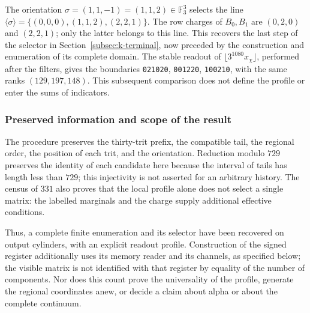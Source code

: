 The orientation \(\sigma=(1,1,-1)=(1,1,2)\in\mathbb F_3^3\)
selects the line
\(\langle\sigma\rangle=\{(0,0,0),(1,1,2),(2,2,1)\}\).
The row charges of \(B_0,B_1\) are \((0,2,0)\) and \((2,2,1)\);
only the latter belongs to this line. This recovers the last step
of the selector in Section~\ref{subsec:k-terminal}, now preceded by
the construction and enumeration of its complete domain. The stable readout
of \(\lfloor3^{1080}x_\chi\rfloor\), performed after the filters,
gives the boundaries \texttt{021020}, \texttt{001220}, \texttt{100210},
with the same ranks \((129,197,148)\). This subsequent comparison does not define
the profile or enter the sums of indicators.

\subsubsection{Preserved information and scope of the result}

The procedure preserves the thirty-trit prefix, the compatible tail,
the regional order, the position of each trit, and the orientation. Reduction
modulo \(729\) preserves the identity of each candidate here because the
interval of tails has length less than \(729\); this injectivity
is not asserted for an arbitrary history. The census of \(331\) also proves
that the local profile alone does not select a single matrix: the
labelled marginals and the charge supply additional effective conditions.

Thus, a complete finite enumeration and its selector have been recovered
on output cylinders, with an explicit readout profile. Construction
of the signed register additionally uses its memory reader and its channels,
as specified below; the visible matrix is not identified with
that register by equality of the number of components. Nor does this count
prove the universality of the profile, generate the regional coordinates
anew, or decide a claim about alpha or about the complete continuum.

